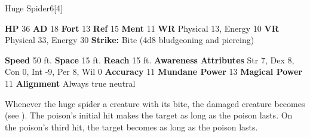  \begin{monsubsection}{Huge Spider}{6}[4]
    \vspace{-1em}\vspace{-1em}
    \vspace{0em}

    
    

    \begin{spellcontent}
      \begin{spelltargetinginfo}
        \pari \textbf{HP} 36 \monsep
          \textbf{AD} 18 \monsep
          \textbf{Fort} 13 \monsep
          \textbf{Ref} 15 \monsep
          \textbf{Ment} 11
        \pari \textbf{WR} Physical 13, Energy 10 \monsep
        \textbf{VR} Physical 33, Energy 30
        \pari \textbf{Strike:}
            Bite  (4d8 bludgeoning and piercing)
      \end{spelltargetinginfo}
    \end{spellcontent}
    \begin{monsterfooter}
      \pari \textbf{Speed} 50 ft. \monsep
        \textbf{Space} 15 ft. \monsep
        \textbf{Reach} 15 ft.
      \pari \textbf{Awareness} 
      \pari \textbf{Attributes}
        Str 7, Dex 8,
        Con 0, Int -9,
        Per 8, Wil 0
      \pari \textbf{Accuracy} 11 \monsep
        \textbf{Mundane Power} 13 \monsep
      \textbf{Magical Power} 11
      \pari \textbf{Alignment} Always true neutral
    \end{monsterfooter}
  \end{monsubsection}
        Whenever the huge spider  a creature with its bite,
          the damaged creature becomes  (see ).
        The poison's initial hit makes the target  as long as the poison lasts.
        On the poison's third hit, the target becomes  as long as the poison lasts.
  

